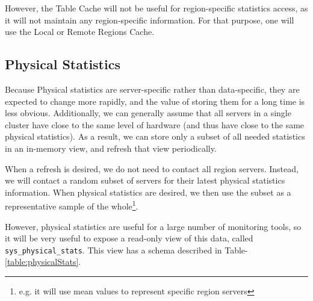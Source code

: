 However, the Table Cache will not be useful for region-specific statistics access, as it will not maintain any region-specific information. For that purpose, one will use the Local or Remote Regions Cache.

\subsection{Physical Statistics}
Because Physical statistics are server-specific rather than data-specific, they are expected to change more rapidly, and the value of storing them for a long time is less obvious. Additionally, we can generally assume that all servers in a single cluster have close to the same level of hardware (and thus have close to the same physical statistics). As a result, we can store only a subset of all needed statistics in an in-memory view, and refresh that view periodically. 

When a refresh is desired, we do not need to contact all region servers. Instead, we will contact a random subset of servers for their latest physical statistics information. When physical statistics are desired, we then use the subset as a representative sample of the whole\footnote{e.g. it will use mean values to represent specific region servers}.

However, physical statistics are useful for a large number of monitoring tools, so it will be very useful to expose a read-only view of this data, called \texttt{sys\_physical\_stats}. This view has a schema described in Table-\ref{table:physicalStats}.

